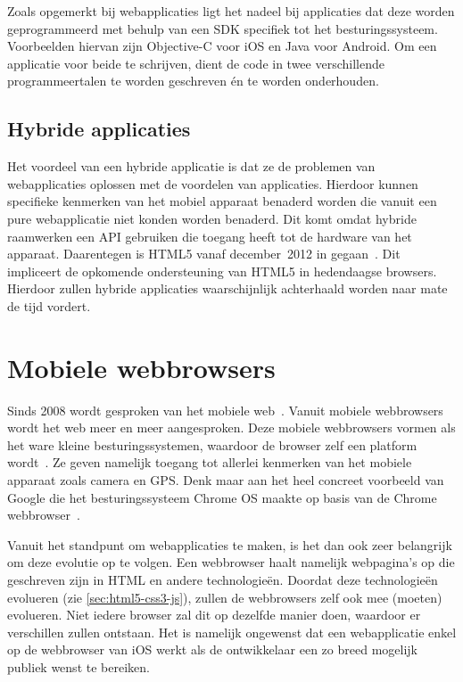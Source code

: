 Zoals opgemerkt bij webapplicaties ligt het nadeel bij  applicaties dat deze worden geprogrammeerd met behulp van een SDK specifiek tot het besturingssysteem.
Voorbeelden hiervan zijn Objective-C voor iOS en Java voor Android.
Om een applicatie voor beide te schrijven, dient de code in twee verschillende programmeertalen te worden geschreven én te worden onderhouden.

\subsection{Hybride applicaties}
\label{sec:literatuur-hydribe}
Het voordeel van een hybride applicatie is dat ze de problemen van webapplicaties oplossen met de voordelen van  applicaties.
Hierdoor kunnen specifieke kenmerken van het mobiel apparaat benaderd worden die vanuit een pure webapplicatie niet konden worden benaderd.
Dit komt omdat hybride raamwerken een API gebruiken die toegang heeft tot de hardware van het apparaat.
Daarentegen is HTML5 vanaf december~2012 in  gegaan~\cite{Jacobs2012}.
Dit impliceert de opkomende ondersteuning van HTML5 in hedendaagse browsers.
Hierdoor zullen hybride applicaties waarschijnlijk achterhaald worden naar mate de tijd vordert.


\section{Mobiele webbrowsers}
\label{sec:mobiele-webbrowsers}
Sinds 2008 wordt gesproken van het mobiele web~\cite{Hales2012}. 
Vanuit mobiele webbrowsers wordt het web meer en meer aangesproken. 
Deze mobiele webbrowsers vormen als het ware kleine besturingssystemen, waardoor de browser zelf een platform wordt~\cite{Hales2012}. 
Ze geven namelijk toegang tot allerlei kenmerken van het mobiele apparaat zoals camera en GPS. 
Denk maar aan het heel concreet voorbeeld van Google die het besturingssysteem Chrome OS maakte op basis van de Chrome webbrowser~\cite{Hales2012}.

Vanuit het standpunt om webapplicaties te maken, is het dan ook zeer belangrijk om deze evolutie op te volgen. 
Een webbrowser haalt namelijk webpagina's op die geschreven zijn in HTML en andere technologieën. 
Doordat deze technologieën evolueren (zie \ref{sec:html5-css3-js}), zullen de webbrowsers zelf ook mee (moeten) evolueren. 
Niet iedere browser zal dit op dezelfde manier doen, waardoor er verschillen zullen ontstaan. 
Het is namelijk ongewenst dat een webapplicatie enkel op de webbrowser van iOS werkt als de ontwikkelaar een zo breed mogelijk publiek wenst te bereiken. 

